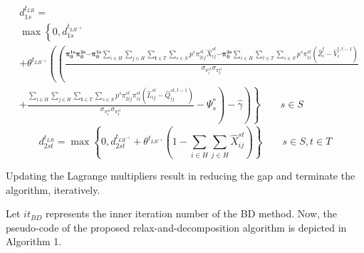 \documentclass[review]{elsarticle}
\begin{document}
\begin{align}\label{eq54} 
&d^{t_{LR}}_{1s}=\\
&\max\left\{0,d^{t_{{LR}^{-1}}}_{1s}\right.\nonumber\\
&+{\theta }^{t_{{LR}^{-1}}}\left(\left(\frac{{\mathbf{ \pi }}^{\mathbf{ 1}\mathbf{ s}}_{\mathbf{ 0}}{\mathbf{ \pi }}^{\mathbf{ 2}\mathbf{ s}}_{\mathbf{ 0}}\mathbf{ -}{\mathbf{ \pi }}^{\mathbf{ 1}\mathbf{ s}}_{\mathbf{ 0}}\sum_{i\in H}{\sum_{j\in H}{\sum_{\mathbf{ t}\in T}{\sum_{s\in S}{p^s{\pi }^{st}_{2ij}{\hat{X}}^{st}_{ij}}}}}\mathbf{ -}{\mathbf{ \pi }}^{\mathbf{ 2}\mathbf{ s}}_{\mathbf{ 0}}\sum_{i\in H}{\sum_{t\in T}{\sum_{s\in S}{p^s{\pi }^{st}_{1i}\left({\hat{Z}}^t_i-{\hat{V}}^{t,t-1}_i\right)}}}}{{\sigma }_{{\pi }^{st}_{1}}{\sigma }_{{\pi }^{st}_{2}}}\right.\right.\nonumber\\
&+\left.\left.\left.\frac{\sum_{i\in H}{\sum_{j\in H}{\sum_{\mathbf{ t}\in T}{\sum_{s\in S}{p^s{\pi }^{st}_{2ij}{\pi }^{st}_{1i}({\hat{L}}^{st}_{ij}-{\hat{Q}}^{st,t-1}_{ij})}}}}}{{\sigma }_{{\pi }^{st}_{1}}{\sigma }_{{\pi }^{st}_{2}}}-{\Psi }^*_s\right)-\widehat{\gamma}\right)\right\}\qquad s\in S\nonumber
\end{align}
\begin{equation}\label{eq55}
d^{t_{LR}}_{2st}=\max\left\{0,d^{t_{{LR}^{-1}}}_{2st}+{\theta }^{t_{{LR}^{-1}}}\left(1-\sum_{i\in H}\sum_{j\in H}\hat{X}^{st}_{ij}\right)\right\}
\qquad s\in S, t\in T
\end{equation}

Updating the Lagrange multipliers result in reducing the gap and terminate the algorithm, iteratively.

Let ${it}_{BD}$ represents the inner iteration number of the BD method. Now, the pseudo-code of the proposed relax-and-decomposition algorithm is depicted in Algorithm 1.
\end{document}
